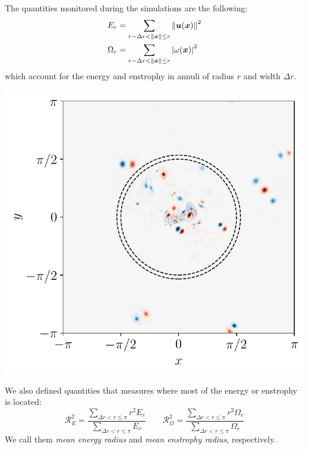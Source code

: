 \documentclass{beamer} %
\begin{document}
\begin{frame}

	\begin{minipage}{0.44\textwidth}
		The quantities monitored during the simulations are the following:
		\begin{align*}
			E_r      & = \sum_{r-\Delta r<\left\|\boldsymbol{x}\right\|\leq r} \left\|{\boldsymbol{u}}(\boldsymbol{x})\right\|^2  \\
			\Omega_r & = \sum_{r-\Delta r<\left\|\boldsymbol{x}\right\|\leq r} \abs{{{\omega}}(\boldsymbol{x})}^2
		\end{align*}
		which account for the energy and enstrophy in annuli of radius $r$ and width $\Delta r$.
	\end{minipage}\hspace{0.04\textwidth}
	\begin{minipage}{0.44\textwidth}
		\centering
		\includegraphics[width=\textwidth]{../images/FlowD_ww.035_annulus.pdf}
	\end{minipage}

	We also defined quantities that measures where most of the energy or enstrophy is located:
	$$
		\mathcal{R}_E^2      = \frac{\sum_{\Delta r<r\leq \pi} r^2 E_r}{\sum_{\Delta r<r\leq \pi} E_r}\qquad 	\mathcal{R}_\Omega^2 = \frac{\sum_{\Delta r<r\leq \pi} r^2 \Omega_r}{\sum_{\Delta r<r\leq \pi} \Omega_r}
	$$
	We call them \emph{mean energy radius} and \emph{mean enstrophy radius}, respectively.
\end{frame}
\end{document}
